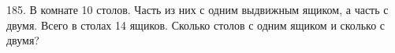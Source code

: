 185. В комнате 10 столов. Часть из них с одним выдвижным ящиком, а часть с двумя. Всего в столах 14 ящиков. Сколько столов с одним ящиком и сколько с двумя?\\
